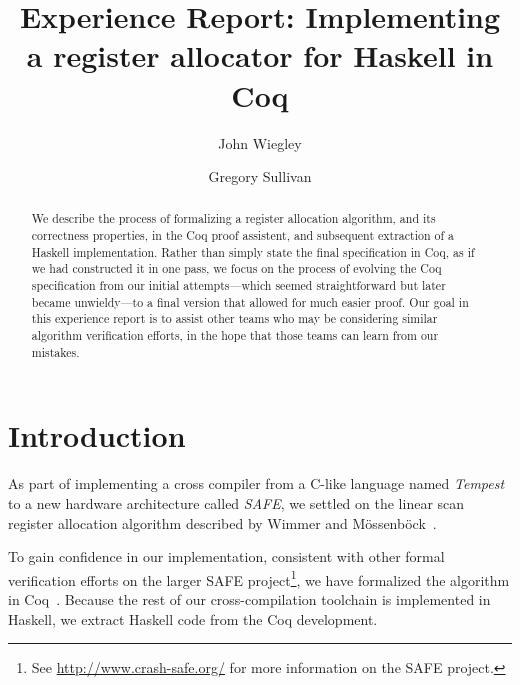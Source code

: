 \documentclass{llncs}
\begin{document}
\frontmatter          %

\pagestyle{headings}  %

\mainmatter

\title{Experience Report: Implementing a register allocator for Haskell
  in Coq}

\author{John Wiegley \and Gregory Sullivan}


\maketitle

\begin{abstract}
  We describe the process of formalizing a register allocation algorithm, and
  its correctness properties, in the Coq proof assistent, and subsequent
  extraction of a Haskell implementation.  Rather than simply state the final
  specification in Coq, as if we had constructed it in one pass, we focus on
  the process of evolving the Coq specification from our initial
  attempts---which seemed straightforward but later became unwieldy---to a
  final version that allowed for much easier proof.  Our goal in this
  experience report is to assist other teams who may be considering similar
  algorithm verification efforts, in the hope that those teams can learn from
  our mistakes.
  
\end{abstract}

\section{Introduction}
\label{sec:intro}

As part of implementing a cross compiler from a C-like language named
\emph{Tempest} to a new hardware architecture called \emph{SAFE}, we settled
on the linear scan register allocation algorithm described by Wimmer and
M\"{o}ssenb\"{o}ck~\cite{Wimmer:2005}.

To gain confidence in our implementation, consistent with other formal
verification efforts on the larger SAFE project\footnote{See
  \url{http://www.crash-safe.org/} for more information on the SAFE project.},
we have formalized the algorithm in Coq~\cite{coq_manual}. Because the rest of
our cross-compilation toolchain is implemented in Haskell, we extract Haskell
code from the Coq development.
\end{document}
